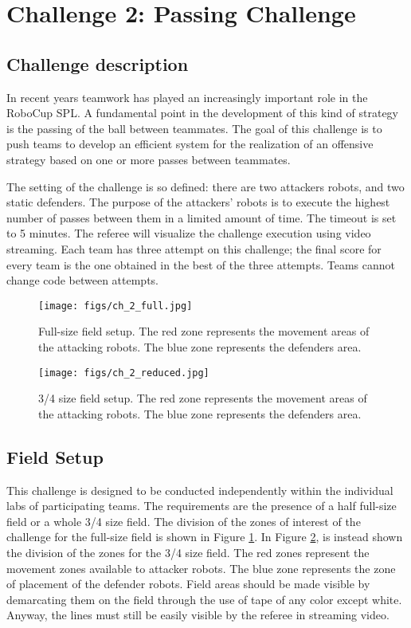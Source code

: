 \section{Challenge 2: Passing Challenge}
\label{sec:PassingChallenge}

\subsection{Challenge description}
In recent years teamwork has played an increasingly important role in the RoboCup SPL. A fundamental point in the development of this kind of strategy is the passing of the ball between teammates. The goal of this challenge is to push teams to develop an efficient system for the realization of an offensive strategy based on one or more passes between teammates. 

The setting of the challenge is so defined: there are two attackers robots, and two static defenders. The purpose of the attackers' robots is to execute the highest number of passes between them in a limited amount of time. The timeout is set to 5 minutes.
The referee will visualize the challenge execution using video streaming. 
Each team has three attempt on this challenge; the final score for every team is the one obtained in the best of the three attempts. Teams cannot change code between attempts.
\begin{figure}[ht]
\texttt{[image: figs/ch\_2\_full.jpg]}
\caption{Full-size field setup. The red zone represents the movement areas of the attacking robots. The blue zone represents the defenders area. }
\label{ch2:zone96}
\centering
\end{figure}

\begin{figure}[ht]
\texttt{[image: figs/ch\_2\_reduced.jpg]}
\caption{3/4 size field setup. The red zone represents the movement areas of the attacking robots. The blue zone represents the defenders area.}
\label{ch2:zone64}
\centering
\end{figure}


\subsection{Field Setup}
This challenge is designed to be conducted independently within the individual labs of participating teams. The requirements are the presence of a half full-size field or a whole 3/4 size field. 
The division of the zones of interest of the challenge for the full-size field is shown in Figure \ref{ch2:zone96}. In Figure \ref{ch2:zone64}, is instead shown the division of the zones for the 3/4 size field.
The red zones represent the movement zones available to attacker robots. The blue zone represents the zone of placement of the defender robots.
Field areas should be made visible by demarcating them on the field through the use of tape of any color except white. Anyway, the lines must still be easily visible by the referee in streaming video.


